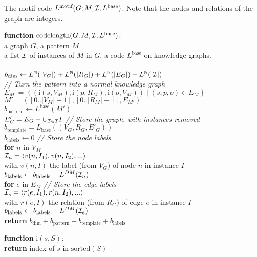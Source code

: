 \documentclass[11pt]{article}
\newcommand{\N}{{\mathbb N}}
\newcommand{\I}{{\cal I}}
\newcommand{\tab}{\hspace*{5mm}}
\begin{document}
\begin{pseudo}[tb]
\caption{The motif code $L^\text{motif}(G ; M, {\cal I}, L^\text{base})$. Note that the nodes and relations of the graph are integers.}
\label{algorithm:motif-code}
{ 
\textbf{function} $\text{codelength}(G; M, {\cal I}, L^\text{base})$:\\
\tab\tab a graph $G$, a pattern $M$\\ 
\tab\tab a list $\cal I$ of instances of $M$ in $G$, a code $L^\text{base}$ on knowledge graphs.\\
\\
\tab $b_\text{dim} \leftarrow L^\N(|V_G|) + L^\N(|R_G|) + L^\N(|E_G|) + L^\N(|\I|)$ \\

\tab \emph{// Turn the pattern into a normal knowledge graph}\\
\tab $E_{M'} = \left\{(\text{i}(s, V_M),  \text{i}(p, R_M), \text{i}(o, V_M)) \mid (s, p, o) \in E_M\right\}$\\
\tab $M' = ([0 ..  |V_M|-1], [0 .. |R_M|-1], E_{M'})$\\
\tab $b_\text{pattern} \leftarrow L^\text{base}(M')$ \\

\tab $E'_G = E_G - \cup_{\I \in {\cal I}} I$ \hfill \emph{// Store the graph, with instances removed}\\
\tab $b_\text{template} = L_\text{base}((V_G, R_G, E'_G))$\\


\tab $b_\text{labels} \leftarrow 0$ \hfill \emph{// Store the node labels} \\
\tab \textbf{for} $n$ in $V_M$\\
\tab\tab $\I_n = \langle v(n, I_1), v(n, I_2), ... \rangle$\\
\tab\tab\tab with $v(n, I)$ the label (from $V_G$) of node $n$ in instance $I$\\
\tab\tab $b_\text{labels} \leftarrow b_\text{labels} + L^{DM}(\I_n)$\\

\tab \textbf{for} $e$ in $E_M$ \hfill \emph{// Store the edge labels}\\
\tab\tab $\I_e = \langle r(e, I_1), r(n, I_2), ... \rangle$\\
\tab\tab\tab with $r(e, I)$ the relation (from $R_G$) of edge $e$ in instance $I$\\
\tab\tab $b_\text{labels} \leftarrow b_\text{labels} + L^{DM}(\I_e)$\\


\tab \textbf{return} $b_\text{dim} + b_\text{pattern} + b_\text{template} + b_\text{labels}$\\
}

\textbf{function} $\text{i}(s, S)$:\\
\tab \textbf{return} index of $s$ in $\text{sorted}(S)$\\

\end{pseudo} 
\end{document}
